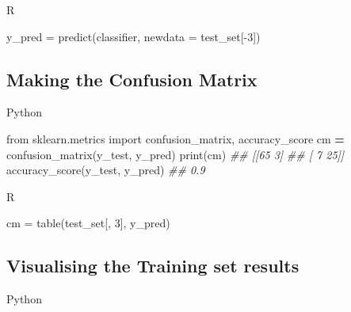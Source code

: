 \documentclass[
]{book}
\newenvironment{Shaded}{\begin{snugshade}}{\end{snugshade}}
\newcommand{\AttributeTok}[1]{\textcolor[rgb]{0.77,0.63,0.00}{#1}}
\newcommand{\BuiltInTok}[1]{#1}
\newcommand{\CommentTok}[1]{\textcolor[rgb]{0.56,0.35,0.01}{\textit{#1}}}
\newcommand{\DecValTok}[1]{\textcolor[rgb]{0.00,0.00,0.81}{#1}}
\newcommand{\FunctionTok}[1]{\textcolor[rgb]{0.00,0.00,0.00}{#1}}
\newcommand{\ImportTok}[1]{#1}
\newcommand{\NormalTok}[1]{#1}
\newcommand{\OperatorTok}[1]{\textcolor[rgb]{0.81,0.36,0.00}{\textbf{#1}}}
\newcommand{\OtherTok}[1]{\textcolor[rgb]{0.56,0.35,0.01}{#1}}
\newcommand{\SpecialCharTok}[1]{\textcolor[rgb]{0.00,0.00,0.00}{#1}}
\theoremstyle{definition}
\theoremstyle{definition}
\theoremstyle{definition}
\theoremstyle{definition}
\theoremstyle{remark}
\begin{document}
R

\begin{Shaded}
\begin{Highlighting}[]
\NormalTok{y\_pred }\OtherTok{=} \FunctionTok{predict}\NormalTok{(classifier, }\AttributeTok{newdata =}\NormalTok{ test\_set[}\SpecialCharTok{{-}}\DecValTok{3}\NormalTok{])}
\end{Highlighting}
\end{Shaded}

\hypertarget{making-the-confusion-matrix-4}{%
\subsection{Making the Confusion Matrix}\label{making-the-confusion-matrix-4}}

Python

\begin{Shaded}
\begin{Highlighting}[]
\ImportTok{from}\NormalTok{ sklearn.metrics }\ImportTok{import}\NormalTok{ confusion\_matrix, accuracy\_score}
\NormalTok{cm }\OperatorTok{=}\NormalTok{ confusion\_matrix(y\_test, y\_pred)}
\BuiltInTok{print}\NormalTok{(cm)}
\CommentTok{\#\# [[65  3]}
\CommentTok{\#\#  [ 7 25]]}
\NormalTok{accuracy\_score(y\_test, y\_pred)}
\CommentTok{\#\# 0.9}
\end{Highlighting}
\end{Shaded}

R

\begin{Shaded}
\begin{Highlighting}[]
\NormalTok{cm }\OtherTok{=} \FunctionTok{table}\NormalTok{(test\_set[, }\DecValTok{3}\NormalTok{], y\_pred)}
\end{Highlighting}
\end{Shaded}

\hypertarget{visualising-the-training-set-results-5}{%
\subsection{Visualising the Training set results}\label{visualising-the-training-set-results-5}}

Python
\end{document}
